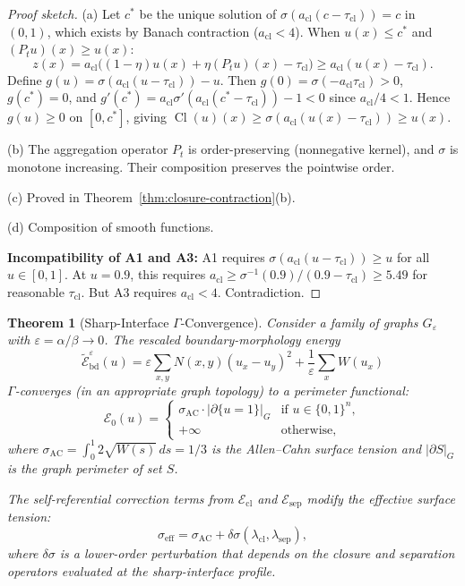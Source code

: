 \documentclass[lettersize,journal]{IEEEtran}
\newtheorem{theorem}{Theorem}
\DeclareMathOperator{\Cl}{Cl}
\begin{document}
\begin{proof}[Proof sketch]
(a) Let $c^*$ be the unique solution of $\sigma(a_{\mathrm{cl}}(c - \tau_{\mathrm{cl}})) = c$ in $(0,1)$, which exists by Banach contraction ($a_{\mathrm{cl}} < 4$). When $u(x) \leq c^*$ and $(P_t u)(x) \geq u(x)$:
\[
z(x) = a_{\mathrm{cl}}\bigl((1-\eta)u(x) + \eta(P_t u)(x) - \tau_{\mathrm{cl}}\bigr) \geq a_{\mathrm{cl}}(u(x) - \tau_{\mathrm{cl}}).
\]
Define $g(u) = \sigma(a_{\mathrm{cl}}(u - \tau_{\mathrm{cl}})) - u$. Then $g(0) = \sigma(-a_{\mathrm{cl}}\tau_{\mathrm{cl}}) > 0$, $g(c^*) = 0$, and $g'(c^*) = a_{\mathrm{cl}}\sigma'(a_{\mathrm{cl}}(c^* - \tau_{\mathrm{cl}})) - 1 < 0$ since $a_{\mathrm{cl}}/4 < 1$. Hence $g(u) \geq 0$ on $[0, c^*]$, giving $\Cl(u)(x) \geq \sigma(a_{\mathrm{cl}}(u(x) - \tau_{\mathrm{cl}})) \geq u(x)$.

(b) The aggregation operator $P_t$ is order-preserving (nonnegative kernel), and $\sigma$ is monotone increasing. Their composition preserves the pointwise order.

(c) Proved in Theorem~\ref{thm:closure-contraction}(b).

(d) Composition of smooth functions.

\textbf{Incompatibility of A1 and A3:} A1 requires $\sigma(a_{\mathrm{cl}}(u - \tau_{\mathrm{cl}})) \geq u$ for all $u \in [0,1]$. At $u = 0.9$, this requires $a_{\mathrm{cl}} \geq \sigma^{-1}(0.9)/(0.9 - \tau_{\mathrm{cl}}) \geq 5.49$ for reasonable $\tau_{\mathrm{cl}}$. But A3 requires $a_{\mathrm{cl}} < 4$. Contradiction.
\end{proof}

\begin{theorem}[Sharp-Interface $\Gamma$-Convergence]
\label{thm:gamma}
Consider a family of graphs $G_\varepsilon$ with $\varepsilon = \alpha/\beta \to 0$. The rescaled boundary-morphology energy
\begin{equation}
\widetilde{\mathcal{E}}_{\mathrm{bd}}^\varepsilon(u) = \varepsilon \sum_{x,y} N(x,y)(u_x - u_y)^2 + \frac{1}{\varepsilon}\sum_x W(u_x)
\end{equation}
$\Gamma$-converges (in an appropriate graph topology) to a perimeter functional:
\begin{equation}
\mathcal{E}_0(u) = \begin{cases}
\sigma_{\mathrm{AC}} \cdot |\partial\{u = 1\}|_G & \text{if } u \in \{0,1\}^n,\\
+\infty & \text{otherwise},
\end{cases}
\end{equation}
where $\sigma_{\mathrm{AC}} = \int_0^1 2\sqrt{W(s)}\,ds = 1/3$ is the Allen--Cahn surface tension and $|\partial S|_G$ is the graph perimeter of set $S$.

The self-referential correction terms from $\mathcal{E}_{\mathrm{cl}}$ and $\mathcal{E}_{\mathrm{sep}}$ modify the effective surface tension:
\begin{equation}
\sigma_{\mathrm{eff}} = \sigma_{\mathrm{AC}} + \delta\sigma(\lambda_{\mathrm{cl}}, \lambda_{\mathrm{sep}}),
\end{equation}
where $\delta\sigma$ is a lower-order perturbation that depends on the closure and separation operators evaluated at the sharp-interface profile.
\end{theorem}
\end{document}
